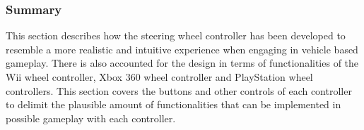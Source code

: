 \subsubsection*{Summary}
This section describes how the steering wheel controller has been developed to resemble a more realistic and intuitive experience when engaging in vehicle based gameplay. There is also accounted for the design in terms of functionalities of the Wii wheel controller, Xbox 360 wheel controller and PlayStation wheel controllers. This section covers the buttons and other controls of each controller to delimit the plausible amount of functionalities that can be implemented in possible gameplay with each controller.